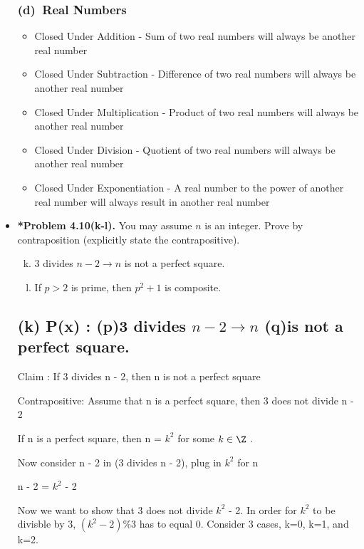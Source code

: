 \documentclass[11pt]{article}
\def\imp{\rightarrow}
\begin{document}
\begin{itemize}
  \subsubsection*{(d)~Real Numbers}
  \begin{itemize}
    \item Closed Under Addition - Sum of two real numbers will always be another real number
    \item Closed Under Subtraction - Difference of two real numbers will always be another real number
    \item Closed Under Multiplication - Product of two real numbers will always be another real number 
    \item Closed Under Division - Quotient of two real numbers will always be another real number
    \item Closed Under Exponentiation - A real number to the power of another real number will always result in another real number
  \end{itemize}

\vspace{0.1in}

\item \textbf{*Problem 4.10(k-l).}
  You may assume $n$ is an integer.
  Prove by contraposition (explicitly state the contrapositive).
  \begin{enumerate}[(a)]
  \setcounter{enumi}{10}
  \item 3 divides $n-2\imp n$ is not a perfect square.
  \item If $p>2$ is prime, then $p^2+1$ is composite.
  \end{enumerate}

  \subsection*{(k) P(x) : (p)3 divides $n-2\imp n$ (q)is not a perfect square.}
  
  Claim : If 3 divides n - 2, then n is not a perfect square

  Contrapositive: Assume that n is a perfect square, then 3 does not divide n - 2

  If n is a perfect square, then n = \(k^2\) for some $k\in\Z$ .

  Now consider n - 2 in (3 divides n - 2), plug in \(k^2\) for n

  n - 2 = \( k^2\) - 2

  Now we want to show that 3 does not divide \(k^2\) - 2. In order for \(k^2\) to be divisble by 3, \((k^2-2)\%3\) has to equal 0. Consider 3 cases, k=0, k=1, and k=2.


\end{itemize}
\end{document}
